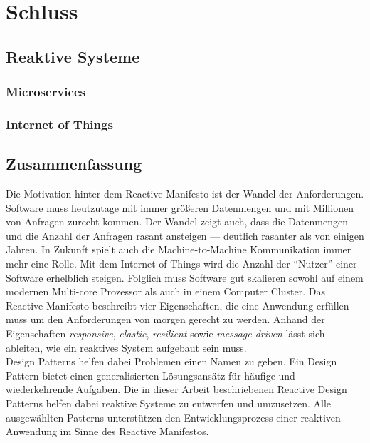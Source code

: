 \chapter{Schluss}

\section{Reaktive Systeme}
\subsection{Microservices}
\subsection{Internet of Things}

\section{Zusammenfassung}
Die Motivation hinter dem Reactive Manifesto ist der Wandel der Anforderungen. Software muss heutzutage mit immer größeren Datenmengen und mit Millionen von Anfragen zurecht kommen. Der Wandel zeigt auch, dass die Datenmengen und die Anzahl der Anfragen rasant ansteigen --- deutlich rasanter als von einigen Jahren. In Zukunft spielt auch die Machine-to-Machine Kommunikation immer mehr eine Rolle. Mit dem Internet of Things wird die Anzahl der \enquote{Nutzer} einer Software erhelblich steigen. Folglich muss Software gut skalieren sowohl auf einem modernen Multi-core Prozessor als auch in einem Computer Cluster. Das Reactive Manifesto beschreibt vier Eigenschaften, die eine Anwendung erfüllen muss um den Anforderungen von morgen gerecht zu werden. Anhand der Eigenschaften \textit{responsive}, \textit{elastic}, \textit{resilient} sowie \textit{message-driven} lässt sich ableiten, wie ein reaktives System aufgebaut sein muss.\\
Design Patterns helfen dabei Problemen einen Namen zu geben. Ein Design Pattern bietet einen generalisierten Lösungsansätz für häufige und wiederkehrende Aufgaben. Die in dieser Arbeit beschriebenen Reactive Design Patterns helfen dabei reaktive Systeme zu entwerfen und umzusetzen. Alle ausgewählten Patterns unterstützen den Entwicklungsprozess einer reaktiven Anwendung im Sinne des Reactive Manifestos.\\
